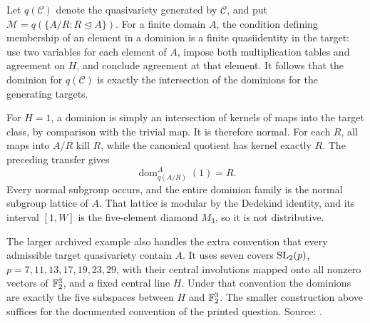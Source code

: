 Let \(q(\mathcal C)\) denote the quasivariety generated by
\(\mathcal C\), and put
\(\mathcal M=q(\{A/R:R\trianglelefteq A\})\).
For a finite domain \(A\), the condition defining membership
of an element in a dominion is a finite quasiidentity in the
target: use two variables for each element of \(A\), impose
both multiplication tables and agreement on \(H\), and
conclude agreement at that element. It follows that the
dominion for \(q(\mathcal C)\) is exactly the intersection
of the dominions for the generating targets.

For \(H=1\), a dominion is simply an intersection of kernels
of maps into the target class, by comparison with the trivial
map. It is therefore normal. For each \(R\), all maps into
\(A/R\) kill \(R\), while the canonical quotient has kernel
exactly \(R\). The preceding transfer gives
\[
 \operatorname{dom}^{A}_{q(A/R)}(1)=R.
\]
Every normal subgroup occurs, and the entire dominion family
is the normal subgroup lattice of \(A\). That lattice is
modular by the Dedekind identity, and its interval
\([1,W]\) is the five-element diamond \(M_3\), so it is
not distributive.

The larger archived example also handles the extra convention
that every admissible target quasivariety contain \(A\).
It uses seven covers \(\operatorname{SL}_2(p)\),
\(p=7,11,13,17,19,23,29\), with their central involutions
mapped onto all nonzero vectors of \(\mathbb F_2^3\), and a fixed
central line \(H\). Under that convention the dominions are
exactly the five subspaces between \(H\) and \(\mathbb F_2^3\).
The smaller construction above suffices for the documented
convention of the printed question. Source:
.

